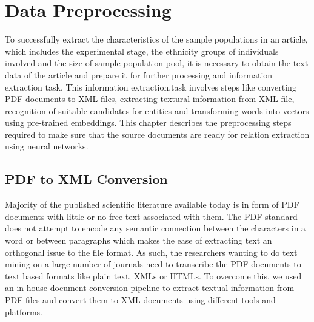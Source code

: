 
\chapter{Data Preprocessing}
\label{chapter:data-preprocessing}
To successfully extract the characteristics of the sample populations in an article, which includes the experimental stage, the ethnicity groups of individuals involved and the size of sample population pool, it is necessary to obtain the text data of the article and prepare it for further processing and information extraction task. This information extraction.task involves steps like converting PDF documents to XML files, extracting textural information from XML file, recognition of suitable candidates for entities and transforming words into vectors using pre-trained embeddings. This chapter describes the preprocessing steps required to make sure that the source documents are ready for relation extraction using neural networks. 

\section{PDF to XML Conversion}
\label{section:pdf-to-xml-conversion}
Majority of the published scientific literature available today is in form of PDF documents with little or no free text associated with them. The PDF standard does not attempt to encode any semantic connection between the characters in a word or between paragraphs which makes the ease of extracting text an orthogonal issue to the file format. As such, the researchers wanting to do text mining on a large number of journals need to transcribe the PDF documents to text based formats like plain text, XMLs or HTMLs. To overcome this, we used an in-house document conversion pipeline \cite{Goyal2016712} to extract textual information from PDF files and convert them to XML documents using different tools and platforms. 

